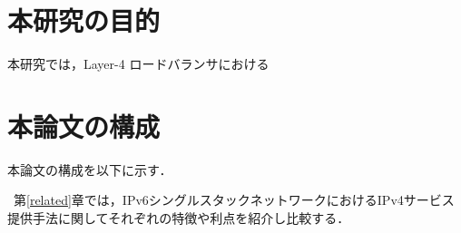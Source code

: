 




\section{本研究の目的}

本研究では，Layer-4 ロードバランサにおける





\section{本論文の構成}

本論文の構成を以下に示す．

~第\ref{related}章では，IPv6シングルスタックネットワークにおけるIPv4サービス提供手法に関してそれぞれの特徴や利点を紹介し比較する．

